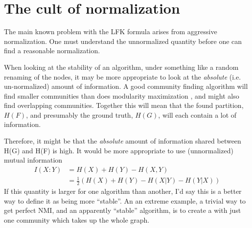\documentclass[9pt,technote]{IEEEtran}
\begin{document}
\begin{comment}
\section{Bringing it together}
If use use the \emph{normalized mutual information} as per \cref{NMI}, then the log terms
in \cref{SummedG} will cancel out. But they don't cancel in \cref{VOI} and this is a major
reason why the \cref{VOI} can be cheated.

If both are done properly, then I would still have a preference for \cref{NMI}. But maybe then a
case could be made for \cref{VOI}, I don't really know too much about any of this. I have a hunch that, if
\cref{SummedG} is properly used in \cref{VOI} that the two terms are likely to be in the same
ballpark anyway and, also, I suspect that this, corrected, \cref{VOI} would then be similar to \cref{NMI} anyway.


\end{comment}
\section{The cult of normalization}
\label{sec:AbNormal}

The main known problem with the LFK formula arises from aggressive normalization.
One must understand the unnormalized quantity before one can find a reasonable normalization.

When looking at the stability of an algorithm, under something like a random renaming of the nodes, it may be more
appropriate to look at the \emph{absolute} (i.e. un-normalized) amount of information. A good community finding algorithm
will find smaller communities \cite{ResLimit} than does modularity maximization \cite{blondel-2008}, and might
also find overlapping communities. Together this will mean that the found partition, $H(F)$, and presumably the ground truth, $H(G)$, will
each contain a lot of information.

Therefore, it might be that the \emph{absolute} amount of information shared between H(G) and H(F) is high. It would be more
appropriate to use (unnormalized) mutual information
\begin{align*}
	I(X:Y) &=  H(X) + H(Y) - H(X,Y)          \\
				&= \frac12 \left( H(X) + H(Y) - H(X|Y) - H(Y|X) \right)
\end{align*}
If this quantity is larger for one algorithm than another, I'd say this is a better way to define it as being more ``stable''.
An an extreme example, a trivial way to get perfect NMI, and an apparently ``stable'' algorithm, is
to create a \grouping{} with just one community which takes up the whole graph.
\end{document}
